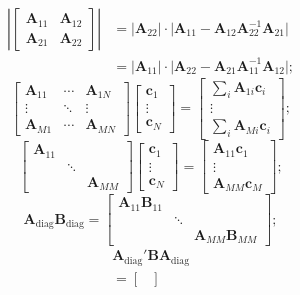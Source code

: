 \documentclass[8pt,letterpaper, landscape]{extarticle} %
\newcommand{\mA}{\ensuremath{\mathbf{A}}}
\newcommand{\mB}{\ensuremath{\mathbf{B}}}
\newcommand{\mc}{\ensuremath{\mathbf{c}}}
\begin{document}
\begin{multicols}{3}
\begin{description}
\begin{align*}
\left \lvert \begin{bmatrix}
\mA_{11} & \mA_{12}  \\ 
\mA_{21} & \mA_{22}
\end{bmatrix} \right \rvert
&= \lvert \mA_{22} \rvert \cdot  \lvert \mA_{11} - \mA_{12} \mA_{22}^{-1} \mA_{21} \rvert  \\
&= \lvert \mA_{11} \rvert \cdot  \lvert \mA_{22} - \mA_{21} \mA_{11}^{-1} \mA_{12} \rvert ;
\end{align*}
%
$$ \begin{bmatrix}
\mA_{11} & \cdots & \mA_{1N} \\ 
\vdots & \ddots & \vdots \\
\mA_{M1} & \cdots & \mA_{MN}
\end{bmatrix}
\begin{bmatrix}
\mc_{1}  \\ 
\vdots  \\
\mc_{N}
\end{bmatrix}
=
\begin{bmatrix}
\sum_i \mA_{1i} \mc_{i}  \\ 
\vdots  \\
\sum_i \mA_{Mi} \mc_{i}
\end{bmatrix}; $$
%
$$ \begin{bmatrix}
\mA_{11} &  &  \\ 
 & \ddots &  \\
 &  & \mA_{MM}
\end{bmatrix}
\begin{bmatrix}
\mc_{1}  \\ 
\vdots  \\
\mc_{N}
\end{bmatrix}
=
\begin{bmatrix}
\mA_{11} \mc_{1}  \\ 
\vdots  \\
\mA_{MM} \mc_{M}
\end{bmatrix}; $$
%
$$ \mA_\text{diag} \mB_\text{diag} =
\begin{bmatrix}
\mA_{11} \mB_{11} &  &  \\ 
 & \ddots &  \\
 &  & \mA_{MM} \mB_{MM}
\end{bmatrix};
$$
%
\begin{multline*}
\mA_{\text{diag}}' \mB \mA_{\text{diag}}
\\ =
\begin{bmatrix}

\end{bmatrix}
\end{multline*}
\end{description}
\end{multicols}
\end{document}
